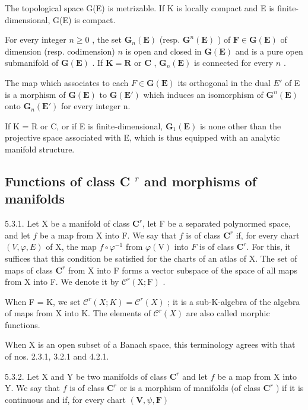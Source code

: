 The topological space G(E) is metrizable. If K is locally compact and E is finite-dimensional, G(E) is compact.

For every integer \(n \geqslant 0\) , the set \(\mathbf{G}_{n}(\mathbf{E})\) (resp. \(\mathbf{G}^{n}(\mathbf{E})\) ) of \(\mathbf{F} \in \mathbf{G}(\mathbf{E})\) of dimension (resp. codimension) \(n\) is open and closed in \(\mathbf{G}(\mathbf{E})\) and is a pure open submanifold of \(\mathbf{G}(\mathbf{E})\) . If \(\mathbf{K} = \mathbf{R}\) or \(\mathbf{C}\) , \(\mathbf{G}_{n}(\mathbf{E})\) is connected for every \(n\) .

The map which associates to each \(F \in \mathbf{G}(\mathbf{E})\) its orthogonal in the dual \(E'\) of E is a morphism of \(\mathbf{G}(\mathbf{E})\) to \(\mathbf{G}(\mathbf{E}')\) which induces an isomorphism of \(\mathbf{G}^{n}(\mathbf{E})\) onto \(\mathbf{G}_{n}(\mathbf{E}')\) for every integer n.

If K = R or C, or if E is finite-dimensional, \(\mathbf{G}_{1}(\mathbf{E})\) is none other than the projective space associated with E, which is thus equipped with an analytic manifold structure.

\subsection{\texorpdfstring{Functions of class C \(^{r}\) and morphisms of manifolds}{Functions of class C\^{}\{r\} and morphisms of manifolds}}

5.3.1. Let X be a manifold of class \(\mathbf{C}^{r}\), let F be a separated polynormed space, and let \(f\) be a map from X into F. We say that \(f\) is of class \(\mathbf{C}^{r}\) if, for every chart \((V, \varphi, E)\) of X, the map \(f\circ\varphi^{-1}\) from \(\varphi(\mathrm V)\) into \(F\) is of class \(\mathbf{C}^{r}\). For this, it suffices that this condition be satisfied for the charts of an atlas of X. The set of maps of class \(\mathbf{C}^{r}\) from X into F forms a vector subspace of the space of all maps from X into F. We denote it by \(\mathcal{C}^{r}(\mathrm{X};\mathrm{F})\) .

When F = K, we set \(\mathcal{C}^{r}(X;K)=\mathcal{C}^{r}(X)\) ; it is a sub-K-algebra of the algebra of maps from X into K. The elements of \(\mathcal{C}^{r}(X)\) are also called morphic functions.

When X is an open subset of a Banach space, this terminology agrees with that of nos. 2.3.1, 3.2.1 and 4.2.1.

5.3.2. Let X and Y be two manifolds of class \(\mathbf{C}^{r}\) and let \(f\) be a map from X into Y. We say that \(f\) is of class \(\mathbf{C}^{r}\) or is a morphism of manifolds (of class \(\mathbf{C}^{r}\) ) if it is continuous and if, for every chart \((\mathbf{V},\psi ,\mathbf{F})\)

